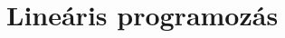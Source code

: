 \documentclass[a4paper,12pt,oneside,openright]{report}
\begin{document}


\tableofcontents
\chapter{Lineáris programozás}







\end{document}
